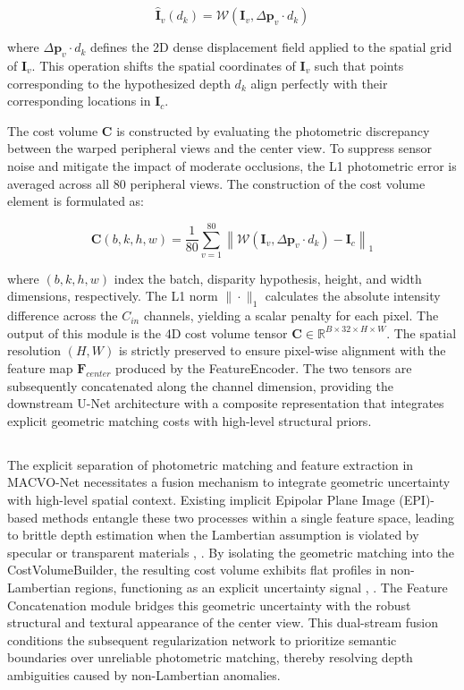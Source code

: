 \documentclass[lettersize,journal]{IEEEtran}
\begin{document}
\begin{equation}
\hat{\mathbf{I}}_v(d_k) = \mathcal{W}(\mathbf{I}_v, \Delta \mathbf{p}_v \cdot d_k)
\end{equation}

where $\Delta \mathbf{p}_v \cdot d_k$ defines the 2D dense displacement field applied to the spatial grid of $\mathbf{I}_v$. This operation shifts the spatial coordinates of $\mathbf{I}_v$ such that points corresponding to the hypothesized depth $d_k$ align perfectly with their corresponding locations in $\mathbf{I}_c$.

The cost volume $\mathbf{C}$ is constructed by evaluating the photometric discrepancy between the warped peripheral views and the center view. To suppress sensor noise and mitigate the impact of moderate occlusions, the L1 photometric error is averaged across all 80 peripheral views. The construction of the cost volume element is formulated as:

\begin{equation}
\mathbf{C}(b, k, h, w) = \frac{1}{80} \sum_{v=1}^{80} \left\| \mathcal{W}(\mathbf{I}_v, \Delta \mathbf{p}_v \cdot d_k) - \mathbf{I}_c \right\|_1
\end{equation}

where $(b, k, h, w)$ index the batch, disparity hypothesis, height, and width dimensions, respectively. The L1 norm $\| \cdot \|_1$ calculates the absolute intensity difference across the $C_{in}$ channels, yielding a scalar penalty for each pixel. The output of this module is the 4D cost volume tensor $\mathbf{C} \in \mathbb{R}^{B \times 32 \times H \times W}$. The spatial resolution $(H, W)$ is strictly preserved to ensure pixel-wise alignment with the feature map $\mathbf{F}_{center}$ produced by the FeatureEncoder. The two tensors are subsequently concatenated along the channel dimension, providing the downstream U-Net architecture with a composite representation that integrates explicit geometric matching costs with high-level structural priors.

\subsection{}

The explicit separation of photometric matching and feature extraction in MACVO-Net necessitates a fusion mechanism to integrate geometric uncertainty with high-level spatial context. Existing implicit Epipolar Plane Image (EPI)-based methods entangle these two processes within a single feature space, leading to brittle depth estimation when the Lambertian assumption is violated by specular or transparent materials \cite{wanner2014}, \cite{heber2018}. By isolating the geometric matching into the CostVolumeBuilder, the resulting cost volume exhibits flat profiles in non-Lambertian regions, functioning as an explicit uncertainty signal \cite{li2021}, \cite{zhang2023}. The Feature Concatenation module bridges this geometric uncertainty with the robust structural and textural appearance of the center view. This dual-stream fusion conditions the subsequent regularization network to prioritize semantic boundaries over unreliable photometric matching, thereby resolving depth ambiguities caused by non-Lambertian anomalies.
\end{document}

